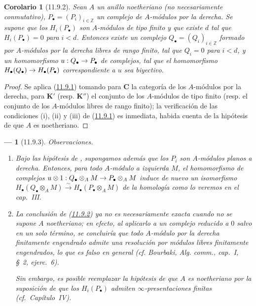 \documentclass[10pt,oneside,openany]{book}
\theoremstyle{egaenv}\newtheorem*{env}{---}
\theoremstyle{egastatement}
\newtheorem*{corollary}{Corolario}
\theoremstyle{egadescription}
\renewcommand{\to}{\mathchoice{\longrightarrow}{\rightarrow}{\rightarrow}{\rightarrow}}
\begin{document}
\begin{corollary}[11.9.2]
\label{0.11.9.2-fr}
Sean $A$ un anillo noetheriano (no necesariamente conmutativo), $P_\bullet=(P_i)_{i\in\mathbb Z}$ un complejo de $A$-módulos por la derecha. Se supone que los $H_i(P_\bullet)$ son $A$-módulos de tipo finito y que existe $d$ tal que $H_i(P_\bullet)=0$ para $i<d$. Entonces existe un complejo $Q_\bullet=(Q_i)_{i\in\mathbb Z}$ formado por $A$-módulos por la derecha libres de rango finito, tal que $Q_i=0$ para $i<d$, y un homomorfismo $u:Q_\bullet\to P_\bullet$ de complejos, tal que el homomorfismo $H_\bullet(Q_\bullet)\to H_\bullet(P_\bullet)$ correspondiente a $u$ sea biyectivo.
\end{corollary}

\begin{proof}
Se aplica (\hyperref[0.11.9.1-fr]{11.9.1}) tomando para $\boldsymbol{C}$ la categoría de los $A$-módulos por la derecha, para $\boldsymbol{K}'$ (resp. $\boldsymbol{K}''$) el conjunto de los $A$-módulos de tipo finito (resp. el conjunto de los $A$-módulos libres de rango finito); la verificación de las condiciones (i), (ii) y (iii) de (\hyperref[0.11.9.1-fr]{11.9.1}) es inmediata, habida cuenta de la hipótesis de que $A$ es noetheriano.
\end{proof}

\begin{env}[11.9.3]
\label{0.11.9.3}
\label{0.11.9.3-fr}
\emph{Observaciones}.
\begin{enumerate}
  \item[{\rm(i)}]
  Bajo las hipótesis de , supongamos además que los
  $P_i$ son $A$-módulos \emph{planos} a derecha.
  Entonces, para todo $A$-módulo a izquierda $M$, el homomorfismo de complejos
  $u\otimes 1:Q_\bullet\otimes_A M\to P_\bullet\otimes_A M$
  induce de nuevo un \emph{isomorfismo}
  $H_\bullet(Q_\bullet\otimes_A M)\xrightarrow{\sim}
H_\bullet(P_\bullet\otimes_A M)$ de la homología como lo veremos en el cap.~III.
\item[{\rm(ii)}] La conclusión de (\hyperref[0.11.9.2-fr]{11.9.2}) ya no es necesariamente exacta cuando no se supone $A$ \emph{noetheriano}; en efecto, al aplicarlo a un complejo reducido a $0$ salvo en un solo término, se concluiría que todo $A$-módulo por la derecha finitamente engendrado admite una \emph{resolución} por
  módulos libres finitamente engendrados, lo que es falso en general
(cf. Bourbaki, \emph{Alg. comm.}, cap.~I, \S~2, ejerc.~6).

  Sin embargo, es posible reemplazar la hipótesis de que $A$ es
  noetheriano por la suposición de que los $H_i(P_\bullet)$ admiten
  $\infty$-presentaciones finitas (cf.\ Capítulo~IV).
\end{enumerate}
\end{env}
\end{document}
